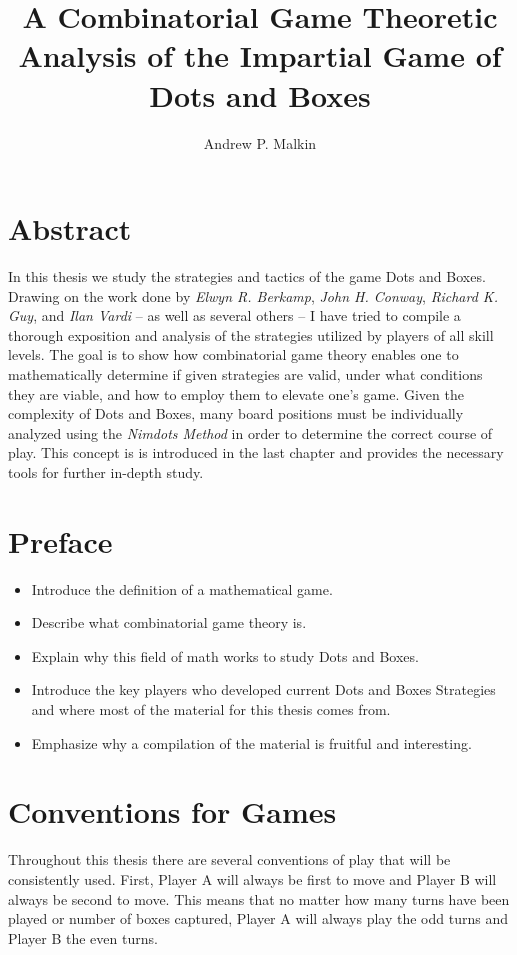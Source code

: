 \documentclass[12pt,twoside]{reedthesis}
\title{A Combinatorial Game Theoretic Analysis of the Impartial Game of Dots and Boxes}
\author{Andrew P. Malkin}
\begin{document}
\maketitle


\tableofcontents


\chapter*{Abstract}
In this thesis we study the strategies and tactics of the game Dots and Boxes.  Drawing on the work done by \emph{Elwyn R. Berkamp}, \emph{John H. Conway}, \emph{Richard K. Guy}, and \emph{Ilan Vardi} -- as well as several others -- I have tried to compile a thorough exposition and analysis of the strategies utilized by players of all skill levels.  The goal is to show how combinatorial game theory enables one to mathematically determine if given strategies are valid, under what conditions they are viable, and how to employ them to elevate one's game. Given the complexity of Dots and Boxes, many board positions must be individually analyzed using the \emph{Nimdots Method} in order to determine the correct course of play.  This concept is is introduced in the last chapter and provides the necessary tools for further in-depth study.


\chapter*{Preface}
\begin{itemize}
\item Introduce the definition of a mathematical game.
\item Describe what combinatorial game theory is.
\item Explain why this field of math works to study Dots and Boxes.
\item Introduce the key players who developed current Dots and Boxes Strategies and where most of the material for this thesis comes from.
\item Emphasize why a compilation of the material is fruitful and interesting.
\end{itemize}


\chapter*{Conventions for Games}
Throughout this thesis there are several conventions of play that will be consistently used.  First, Player A will always be first to move and Player B will always be second to move.  This means that no matter how many turns have been played or number of boxes captured, Player A will always play the odd turns and Player B the even turns.
\end{document}
